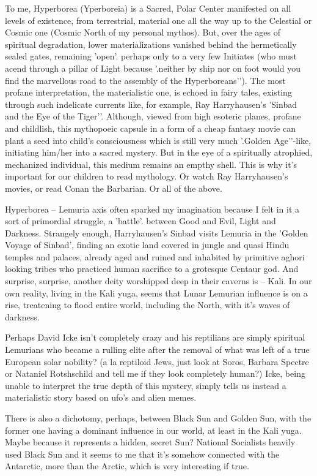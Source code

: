 \begin{footnotesize}
\begin{sffamily}
To me, Hyperborea (Yperboreia) is a Sacred, Polar Center manifested on all levels of existence, from terrestrial, material one all the way up to the Celestial or Cosmic one (Cosmic North of my personal mythos). But, over the ages of spiritual degradation, lower materializations vanished behind the hermetically sealed gates, remaining 'open'. perhaps only to a very few Initiates (who must acend through a pillar of Light because '.neither by ship nor on foot would you find the marvellous road to the assembly of the Hyperboreans’’). The most profane interpretation, the materialistic one, is echoed in fairy tales, existing through such indelicate currents like, for example, Ray Harryhausen's 'Sinbad and the Eye of the Tiger’’. Although, viewed from high esoteric planes, profane and childlish, this mythopoeic capsule in a form of a cheap fantasy movie can plant a seed into child's consciousness which is still very much '.Golden Age’’-like, initiating him/her into a sacred mystery. But in the eye of a spiritually atrophied, mechanized individual, this medium remains an empthy shell. This is why it's important for our children to read mythology. Or watch Ray Harryhausen's movies, or read Conan the Barbarian. Or all of the above.

Hyperborea – Lemuria axis often sparked my imagination because I felt in it a sort of primordial struggle, a 'battle'. between Good and Evil, Light and Darkness. Strangely enough, Harryhausen's Sinbad visits Lemuria in the 'Golden Voyage of Sinbad’, finding an exotic land covered in jungle and quasi Hindu temples and palaces, already aged and ruined and inhabited by primitive aghori looking tribes who practiced human sacrifice to a grotesque Centaur god. And surprise, surprise, another deity worshipped deep in their caverns is – Kali. In our own reality, living in the Kali yuga, seems that Lunar Lemurian influence is on a rise, treatening to flood entire world, including the North, with it's waves of darkness.

Perhaps David Icke isn't completely crazy and his reptilians are simply spiritual Lemurians who became a rulling elite after the removal of what was left of a true European solar nobility? (a la reptiloid Jews, just look at Soros, Barbara Spectre or Nataniel Rotshschild and tell me if they look completely human?) Icke, being unable to interpret the true depth of this mystery, simply tells us instead a materialistic story based on ufo's and alien memes.

There is also a dichotomy, perhaps, between Black Sun and Golden Sun, with the former one having a dominant influence in our world, at least in the Kali yuga. Maybe because it represents a hidden, secret Sun? National Socialists heavily used Black Sun and it seems to me that it's somehow connected with the Antarctic, more than the Arctic, which is very interesting if true.


\end{sffamily}
\end{footnotesize}
